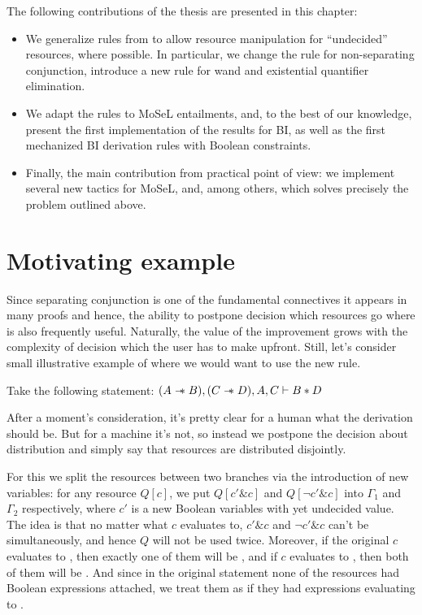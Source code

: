 The following contributions of the thesis are presented in this chapter:
\begin{itemize}
\item We generalize rules from \citet{harlandResourceDistributionBooleanConstraints2003} to allow resource manipulation for ``undecided'' resources, where possible.
  In particular, we change the rule for non-separating conjunction, introduce a new rule for wand and existential quantifier elimination.
\item We adapt the rules to MoSeL entailments, and, to the best of our knowledge, present the first implementation of the results for BI, as well as the first mechanized BI derivation rules with Boolean constraints.
\item Finally, the main contribution from practical point of view: we implement several new tactics for MoSeL, and, among others,  which solves precisely the problem outlined above.
\end{itemize}

\section{Motivating example}

Since separating conjunction is one of the fundamental connectives it appears in many proofs and hence, the ability to postpone decision which resources go where is also frequently useful.
Naturally, the value of the improvement grows with the complexity of decision which the user has to make upfront.
Still, let's consider small illustrative example of where we would want to use the new rule.

Take the following statement:
\((A \mathrel{-\mkern-6mu*} B), (C \mathrel{-\mkern-6mu*} D), A, C \vdash B * D\)

After a moment's consideration, it's pretty clear for a human what the derivation should be.
But for a machine it's not, so instead we postpone the decision about distribution and simply say that resources are distributed disjointly.

For this we split the resources between two branches via the introduction of new variables:
for any resource \(Q[c]\), we put \(Q[c' \& c]\) and \(Q[\neg c' \& c]\) into \(\Gamma_1\) and \(\Gamma_2\) respectively, where \(c'\) is a new Boolean variables with yet undecided value.
The idea is that no matter what \(c\) evaluates to, \(c' \& c\) and \(\neg c' \& c\) can't be \true simultaneously, and hence \(Q\) will not be used twice.
Moreover, if the original \(c\) evaluates to \true, then exactly one of them will be \true, and if \(c\) evaluates to \false, then both of them will be \false.
And since in the original statement none of the resources had Boolean expressions attached, we treat them as if they had expressions evaluating to \true.

